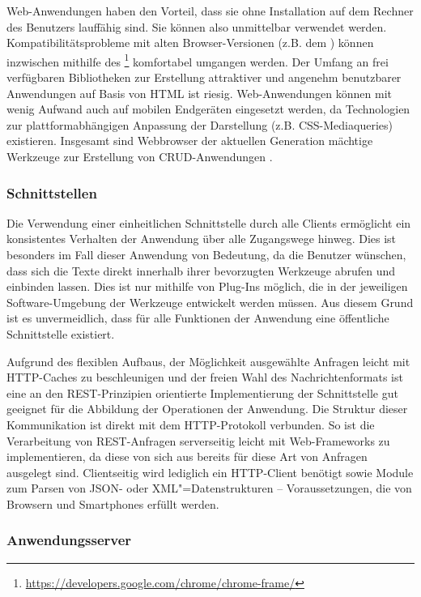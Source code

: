 Web-Anwendungen haben den Vorteil, dass sie ohne Installation auf dem Rechner des Benutzers lauffähig sind. Sie können also unmittelbar verwendet werden. Kompatibilitätsprobleme mit alten Browser-Versionen (z.B. dem ) können inzwischen mithilfe des \footnote{\url{https://developers.google.com/chrome/chrome-frame/}} komfortabel umgangen werden. Der Umfang an frei verfügbaren Bibliotheken zur Erstellung attraktiver und angenehm benutzbarer Anwendungen auf Basis von HTML ist riesig. Web-Anwendungen können mit wenig Aufwand auch auf mobilen Endgeräten eingesetzt werden, da Technologien zur plattformabhängigen Anpassung der Darstellung (z.B. CSS-Mediaqueries) existieren. Insgesamt sind Webbrowser der aktuellen Generation mächtige Werkzeuge zur Erstellung von CRUD-Anwendungen \cite{ms-key-software-development-trends} .

\subsubsection{Schnittstellen} 

Die Verwendung einer einheitlichen Schnittstelle durch alle Clients ermöglicht ein konsistentes Verhalten der Anwendung über alle Zugangswege hinweg. Dies ist besonders im Fall dieser Anwendung von Bedeutung, da die Benutzer wünschen, dass sich die Texte direkt innerhalb ihrer bevorzugten Werkzeuge abrufen und einbinden lassen. Dies ist nur mithilfe von Plug-Ins möglich, die in der jeweiligen Software-Umgebung der Werkzeuge entwickelt werden müssen. Aus diesem Grund ist es unvermeidlich, dass für alle Funktionen der Anwendung eine öffentliche Schnittstelle existiert.

Aufgrund des flexiblen Aufbaus, der Möglichkeit ausgewählte Anfragen leicht mit HTTP-Caches zu beschleunigen und der freien Wahl des Nachrichtenformats ist eine an den REST-Prinzipien orientierte Implementierung der Schnittstelle gut geeignet für die Abbildung der Operationen der Anwendung. Die Struktur dieser Kommunikation ist direkt mit dem HTTP-Protokoll verbunden. So ist die Verarbeitung von REST-Anfragen serverseitig leicht mit Web-Frameworks zu implementieren, da diese von sich aus bereits für diese Art von Anfragen ausgelegt sind. Clientseitig wird lediglich ein HTTP-Client benötigt sowie Module zum Parsen von JSON- oder XML"=Datenstrukturen -- Voraussetzungen, die von Browsern und Smartphones erfüllt werden. 

\subsubsection{Anwendungsserver}

